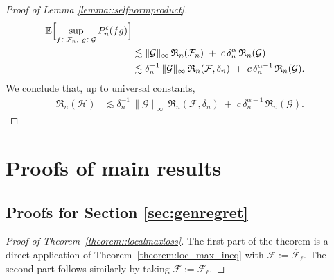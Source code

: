 \documentclass[11pt]{article}
\theoremstyle{plain}
\theoremstyle{definition} %
\begin{document}
\begin{proof}[Proof of Lemma \ref{lemma::selfnormproduct}]
\begin{align*}
\mathbb E\Bigl[\sup_{f\in\mathcal F_n,\ g\in\mathcal G} P_n^\epsilon(fg)\Bigr]\\
&\lesssim
\|\mathcal G\|_\infty\,\mathfrak R_n(\mathcal F_n)
\;+\;
c\,\delta_n^\alpha\,\mathfrak R_n(\mathcal G)\\
&\lesssim
\delta_n^{-1}\,\|\mathcal G\|_\infty\,\mathfrak R_n(\mathcal F,\delta_n)
\;+\;
c\,\delta_n^{\alpha-1}\,\mathfrak R_n(\mathcal G).
\end{align*}
We conclude that, up to universal constants,
\begin{align*}
\mathfrak R_n(\mathcal H)
&\lesssim
\delta_n^{-1}\,\|\mathcal G\|_\infty\,\mathfrak R_n(\mathcal F,\delta_n)
\;+\;
c\,\delta_n^{\alpha-1}\,\mathfrak R_n(\mathcal G).
\end{align*}

\end{proof}

 

 

  

 
 

 



\section{Proofs of main results}

\subsection{Proofs for Section \ref{sec:genregret}}

\begin{proof}[Proof of Theorem~\ref{theorem::localmaxloss}]
The first part of the theorem is a direct application of Theorem~\ref{theorem:loc_max_ineq} with
$\mathcal{F}:=\overline{\mathcal{F}}_{\ell}$. The second part follows similarly by taking
$\mathcal{F}:=\mathcal{F}_{\ell}$.
\end{proof}
\end{document}
